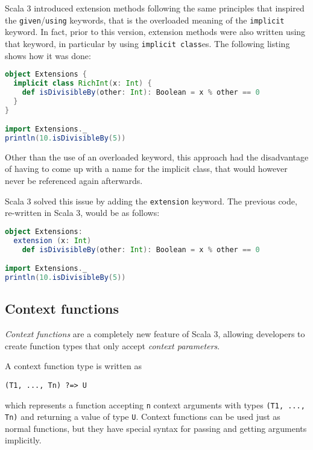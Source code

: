 Scala 3 introduced extension methods following the same principles that inspired the \texttt{given}/\texttt{using} keywords, that is the overloaded meaning of the \texttt{implicit} keyword.
%
In fact, prior to this version, extension methods were also written using that keyword, in particular by using \texttt{implicit class}es.
%
The following listing shows how it was done:
%
\begin{lstlisting}[frame=single, language=scala]
object Extensions {
  implicit class RichInt(x: Int) {
    def isDivisibleBy(other: Int): Boolean = x % other == 0
  }
}

import Extensions._
println(10.isDivisibleBy(5))
\end{lstlisting}
%
Other than the use of an overloaded keyword, this approach had the disadvantage of having to come up with a name for the implicit class, that would however never be referenced again afterwards.

Scala 3 solved this issue by adding the \texttt{extension} keyword.
%
The previous code, re-written in Scala 3, would be as follows:
%
\begin{lstlisting}[frame=single, language=scala]
object Extensions:
  extension (x: Int)
    def isDivisibleBy(other: Int): Boolean = x % other == 0

import Extensions._
println(10.isDivisibleBy(5))
\end{lstlisting}

\subsection{Context functions}
\label{sec:context-functions}

\textit{Context functions} are a completely new feature of Scala 3, allowing developers to create function types that only accept \textit{context parameters}.

A context function type is written as
\begin{verbatim}
(T1, ..., Tn) ?=> U
\end{verbatim}
which represents a function accepting \texttt{n} context arguments with types \texttt{(T1, ..., Tn)} and returning a value of type \texttt{U}.
%
Context functions can be used just as normal functions, but they have special syntax for passing and getting arguments implicitly.

